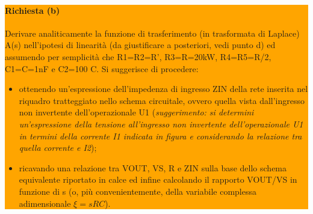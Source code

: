 \noindent\colorbox{orange}{
  \begin{minipage}{1.0\linewidth}
    \paragraph{Richiesta (b)}
    Derivare analiticamente la funzione di trasferimento (in trasformata di Laplace) A(s)
    nell'ipotesi di linearità (da giustificare a posteriori, vedi punto d) ed assumendo per
    semplicità che R1=R2=R', R3=R=20kW, R4=R5=R/2, C1=C=1nF e C2=100 C.
    Si suggerisce di procedere:
    \begin{itemize}
    \item[i]
      ottenendo un'espressione dell'impedenza di ingresso ZIN della rete inserita nel
      riquadro tratteggiato nello schema circuitale, ovvero quella vista dall'ingresso non
      invertente dell'operazionale U1 (\textit{suggerimento: si determini un'espressione della
        tensione all'ingresso non invertente dell'operazionale U1 in termini della corrente I1
        indicata in figura e considerando la relazione tra quella corrente e I2});
    \item[ii]
      ricavando una relazione tra VOUT, VS, R e ZIN sulla base dello schema equivalente
      riportato in calce ed infine calcolando il rapporto VOUT/VS in funzione di s (o, più
      convenientemente, della variabile complessa adimensionale $\xi=sRC$).
    \end{itemize}
  \end{minipage}
}
